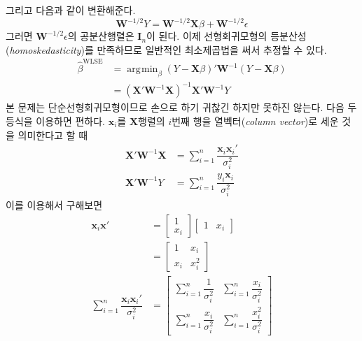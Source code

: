 \documentclass[answers]{exam}
\DeclareMathOperator*{\argmin}{\arg\!\min}
\begin{document}
\begin{questions}
\begin{solution}
\begin{enumerate}[(a)]
\begin{equation}
        \end{equation}
        그리고 다음과 같이 변환해준다.
        \begin{equation}
          \mathbf{W}^{-1/2}Y=\mathbf{W}^{-1/2}\mathbf{X}\beta+\mathbf{W}^{-1/2}\epsilon
        \end{equation}
        그러면 $\mathbf{W}^{-1/2}\epsilon$의 공분산행렬은 $\mathbf{I}_{n}$이 된다. 이제 선형회귀모형의 등분산성(\emph{homoskedasticity})를 만족하므로 일반적인 최소제곱법을 써서 추정할 수 있다.
        \begin{align}
          \widehat{\beta}^{\text{WLSE}} &= \argmin_{\beta}\left(Y-\mathbf{X}\beta\right)'\mathbf{W}^{-1}\left(Y-\mathbf{X}\beta\right)\\
          &= \left(\mathbf{X}'\mathbf{W}^{-1}\mathbf{X}\right)^{-1}\mathbf{X}'\mathbf{W}^{-1}Y
        \end{align}
        본 문제는 단순선형회귀모형이므로 손으로 하기 귀찮긴 하지만 못하진 않는다. 다음 두 등식을 이용하면 편하다. $\mathbf{x}_{i}$를 $\mathbf{X}$행렬의 $i$번째 행을 열벡터(\emph{column vector})로 세운 것을 의미한다고 할 때
        \begin{align}
          \mathbf{X}'\mathbf{W}^{-1}\mathbf{X} &= \sum_{i=1}^{n}\dfrac{\mathbf{x}_{i}\mathbf{x}_{i}'}{\sigma_{i}^{2}}\\
          \mathbf{X}'\mathbf{W}^{-1}Y &= \sum_{i=1}^{n}\dfrac{y_{i}\mathbf{x}_{i}}{\sigma_{i}^{2}}
        \end{align}
        이를 이용해서 구해보면
        \begin{align}
          \mathbf{x}_{i}\mathbf{x}' &= \begin{bmatrix} 1\\ x_{i}  \end{bmatrix}\begin{bmatrix}1 & x_{i} \end{bmatrix}\\
          &= \begin{bmatrix}1 & x_{i}\\ x_{i} & x_{i}^{2}  \end{bmatrix}\\
          \sum_{i=1}^{n}\dfrac{\mathbf{x}_{i}\mathbf{x}_{i}'}{\sigma_{i}^{2}} &= \begin{bmatrix}\displaystyle \sum_{i=1}^{n}\dfrac{1}{\sigma_{i}^{2}} & \displaystyle \sum_{i=1}^{n}\dfrac{x_{i}}{\sigma_{i}^{2}}\\ \displaystyle \sum_{i=1}^{n}\dfrac{x_{i}}{\sigma_{i}^{2}} &  \displaystyle \sum_{i=1}^{n}\dfrac{x_{i}^{2}}{\sigma_{i}^{2}}  \end{bmatrix}\\

\end{align}
\end{enumerate}
\end{solution}
\end{questions}
\end{document}
